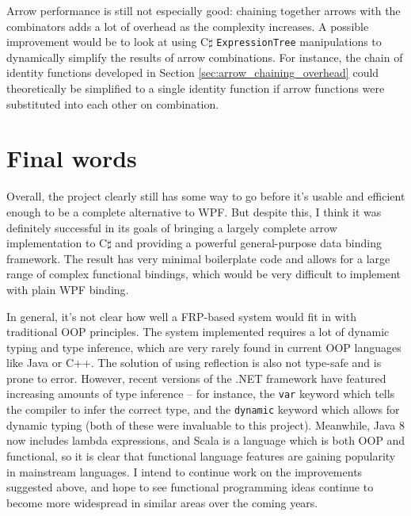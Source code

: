 \documentclass[12pt,twoside,notitlepage]{report}
\begin{document}
Arrow performance is still not especially good: chaining together arrows with the combinators adds a lot of overhead as the complexity increases. A possible improvement would be to look at using C$\sharp$ \texttt{ExpressionTree} manipulations to dynamically simplify the results of arrow combinations. For instance, the chain of identity functions developed in Section \ref{sec:arrow_chaining_overhead} could theoretically be simplified to a single identity function if arrow functions were substituted into each other on combination.

\section{Final words}

Overall, the project clearly still has some way to go before it's usable and efficient enough to be a complete alternative to WPF. But despite this, I think it was definitely successful in its goals of bringing a largely complete arrow implementation to C$\sharp$ and providing a powerful general-purpose data binding framework. The result has very minimal boilerplate code and allows for a large range of complex functional bindings, which would be very difficult to implement with plain WPF binding.

In general, it's not clear how well a FRP-based system would fit in with traditional OOP principles. The system implemented requires a lot of dynamic typing and type inference, which are very rarely found in current OOP languages like Java or C++. The solution of using reflection is also not type-safe and is prone to error. However, recent versions of the .NET framework have featured increasing amounts of type inference -- for instance, the \texttt{var} keyword which tells the compiler to infer the correct type, and the \texttt{dynamic} keyword which allows for dynamic typing (both of these were invaluable to this project). Meanwhile, Java 8 now includes lambda expressions, and Scala is a language which is both OOP and functional, so it is clear that functional language features are gaining popularity in mainstream languages. I intend to continue work on the improvements suggested above, and hope to see functional programming ideas continue to become more widespread in similar areas over the coming years.

\cleardoublepage



\nocite{arrow_calculus}
\nocite{hughes_arrows}
\nocite{arrows_robots_frp}
\nocite{frp_first_principles}
\nocite{composing_reactive_animations}
\nocite{haskell_arrows}
\nocite{arrows_and_computation}
\nocite{hughes_programming_with_arrows}
\nocite{wpf_data_binding_overview}
\nocite{functional_reactive_programming}
\nocite{invertible_arrows}
\nocite{arrow_notation}
\nocite{postsharp}
\end{document}
